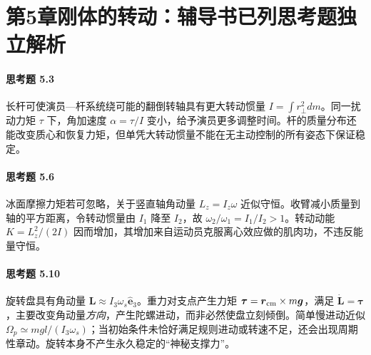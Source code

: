 \section*{第5章\quad 刚体的转动：辅导书已列思考题独立解析}
\paragraph{思考题 5.3}
长杆可使演员—杆系统绕可能的翻倒转轴具有更大转动惯量 \(I=\int r_\perp^2dm\)。同一扰动力矩 \(\tau\) 下，角加速度 \(\alpha=\tau/I\) 变小，给予演员更多调整时间。杆的质量分布还能改变质心和恢复力矩，但单凭大转动惯量不能在无主动控制的所有姿态下保证稳定。

\paragraph{思考题 5.6}
冰面摩擦力矩若可忽略，关于竖直轴角动量 \(L_z=I_z\omega\) 近似守恒。收臂减小质量到轴的平方距离，令转动惯量由 \(I_1\) 降至 \(I_2\)，故 \(\boxed{\omega_2/\omega_1=I_1/I_2>1}\)。转动动能 \(K=L_z^2/(2I)\) 因而增加，其增加来自运动员克服离心效应做的肌肉功，不违反能量守恒。

\paragraph{思考题 5.10}
旋转盘具有角动量 \(\boldsymbol L\approx I_3\omega_s\hat{\boldsymbol e}_3\)。重力对支点产生力矩 \(\boldsymbol\tau=\boldsymbol r_{\rm cm}\times m\boldsymbol g\)，满足 \(\dot{\boldsymbol L}=\boldsymbol\tau\)，主要改变角动量\emph{方向}，产生陀螺进动，而非必然使盘立刻倾倒。简单慢进动近似 \(\Omega_p\simeq mgl/(I_3\omega_s)\)；当初始条件未恰好满足规则进动或转速不足，还会出现周期性章动。旋转本身不产生永久稳定的“神秘支撑力”。

